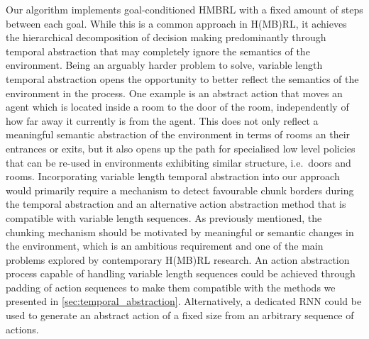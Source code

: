 \documentclass{article}
\begin{document}
Our algorithm implements goal-conditioned HMBRL with a fixed amount of steps between each goal. While this is a common approach in H(MB)RL, it achieves the hierarchical decomposition of decision making predominantly through temporal abstraction that may completely ignore the semantics of the environment. Being an arguably harder problem to solve, variable length temporal abstraction opens the opportunity to better reflect the semantics of the environment in the process. One example is an abstract action that moves an agent which is located inside a room to the door of the room, independently of how far away it currently is from the agent. This does not only reflect a meaningful semantic abstraction of the environment in terms of rooms an their entrances or exits, but it also opens up the path for specialised low level policies that can be re-used in environments exhibiting similar structure, i.e.\ doors and rooms. Incorporating variable length temporal abstraction into our approach would primarily require a mechanism to detect favourable chunk borders during the temporal abstraction and an alternative action abstraction method that is compatible with variable length sequences. As previously mentioned, the chunking mechanism should be motivated by meaningful or semantic changes in the environment, which is an ambitious requirement and one of the main problems explored by contemporary H(MB)RL research. An action abstraction process capable of handling variable length sequences could be achieved through padding of action sequences to make them compatible with the methods we presented in \ref{sec:temporal_abstraction}. Alternatively, a dedicated RNN could be used to generate an abstract action of a fixed size from an arbitrary sequence of actions.
\end{document}
